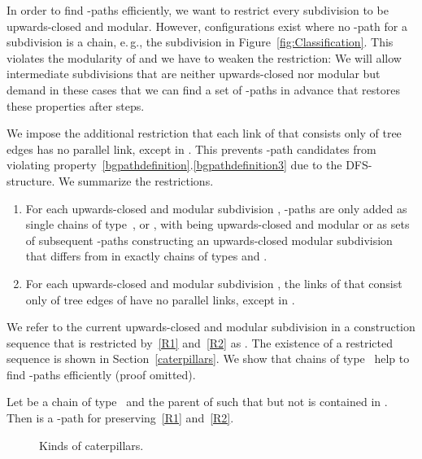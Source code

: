 In order to find \BG-paths efficiently, we want to restrict every subdivision  to be upwards-closed and modular. However, configurations exist where no \BG-path for a subdivision  is a chain, e.\,g., the subdivision  in Figure~\ref{fig:Classification}. This violates the modularity of  and we have to weaken the restriction: We will allow intermediate subdivisions that are neither upwards-closed nor modular but demand in these cases that we can find a set of  \BG-paths in advance that restores these properties after  steps.







We impose the additional restriction that each link of  that consists only of tree edges has no parallel link, except  in . This prevents \BG-path candidates from violating property~\ref{bgpathdefinition}.\ref{bgpathdefinition3} due to the DFS-structure. We summarize the restrictions.


\begin{enumerate}[label=(), leftmargin=*]
	\item For each upwards-closed and modular subdivision , \BG-paths are only added as\label{R1} single chains of type~,  or , with  being upwards-closed and modular or as sets of  subsequent \BG-paths constructing an upwards-closed modular subdivision  that differs from  in exactly  chains of types  and .
\item For each upwards-closed and modular subdivision , the links of  that consist only of tree edges of  have no parallel links, except  in .\label{R2}
\end{enumerate}



We refer to the current upwards-closed and modular subdivision in a construction sequence that is restricted by~\ref{R1} and~\ref{R2} as . The existence of a restricted sequence is shown in Section~\ref{caterpillars}.
We show that chains of type~ help to find \BG-paths efficiently (proof omitted).

\begin{lemma}\label{structural3a}
Let  be a chain of type~ and  the parent of  such that  but not  is contained in . Then  is a \BG-path for  preserving~\ref{R1} and~\ref{R2}.
\end{lemma}



\begin{wrapfigure}[14]{R}{5.7cm}
	\vspace{-0.5cm}
	\centering
\hspace{0.01cm}
	\caption{Kinds of caterpillars.}
	\label{fig:Caterpillar}
\end{wrapfigure}

